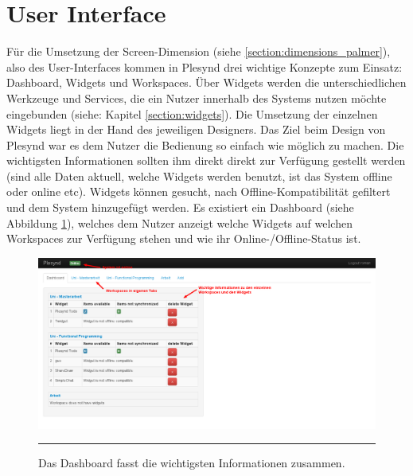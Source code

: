 \section{User Interface}\label{section:user_interface}
Für die Umsetzung der Screen-Dimension (siehe \ref{section:dimensions_palmer}), also des User-Interfaces kommen in Plesynd drei wichtige Konzepte zum Einsatz: Dashboard, Widgets und Workspaces. Über Widgets werden die unterschiedlichen Werkzeuge und Services, die ein Nutzer innerhalb des Systems nutzen möchte eingebunden (siehe: Kapitel \ref{section:widgets}). Die Umsetzung der einzelnen Widgets liegt in der Hand des jeweiligen Designers. Das Ziel beim Design von Plesynd war es dem Nutzer die Bedienung so einfach wie möglich zu machen. Die wichtigsten Informationen sollten ihm direkt direkt zur Verfügung gestellt werden (sind alle Daten aktuell, welche Widgets werden benutzt, ist das System offline oder online etc). Widgets können gesucht, nach Offline-Kompatibilität gefiltert und dem System hinzugefügt werden. Es existiert ein Dashboard (siehe Abbildung \ref{fig:plesynd_dashboard}), welches dem Nutzer anzeigt welche Widgets auf welchen Workspaces zur Verfügung stehen und wie ihr Online-/Offline-Status ist.
\begin{figure}
  \centering
  \includegraphics[width=\textwidth,height=\textheight,keepaspectratio]{./Figures/plesynd_dashboard.png}
    \rule{35em}{0.5pt}
  \caption[Plesynd User-Interface: Dashboard]{Das Dashboard fasst die wichtigsten Informationen zusammen.}
  \label{fig:plesynd_dashboard}
\end{figure}

